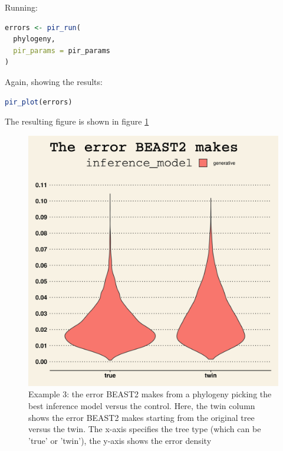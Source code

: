 \documentclass{article}
\begin{document}
Running:

\begin{lstlisting}[language=R, floatplacement=H, frame=single]
errors <- pir_run(
  phylogeny,
  pir_params = pir_params
)
\end{lstlisting}

Again, showing the results:

\begin{lstlisting}[language=R, floatplacement=H, frame=single]
pir_plot(errors)
\end{lstlisting}

The resulting figure is shown in figure \ref{fig:example_3}

\begin{figure}[h]
  \includegraphics[width=\textwidth]{figure_example_3.png}
  \caption{
    Example 3: the error BEAST2 makes from a phylogeny picking the best inference model versus the control.
    Here, the twin column shows the error BEAST2 makes starting from the original tree versus the twin. 
    The x-axis specifies the tree type (which can be 'true' or 'twin'),
    the y-axis shows the error density
  }
  \label{fig:example_3}
\end{figure}

\end{document}
